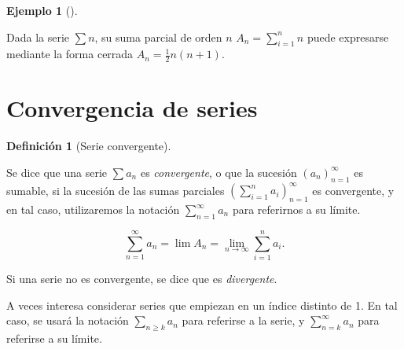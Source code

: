 \documentclass[
  a4paper,
]{scrreport}
\theoremstyle{definition}
\newtheorem{example}{Ejemplo}[chapter]
\theoremstyle{plain}
\theoremstyle{definition}
\newtheorem{definition}{Definición}[chapter]
\theoremstyle{definition}
\theoremstyle{plain}
\theoremstyle{plain}
\theoremstyle{remark}
\begin{document}
\begin{example}[]\protect\hypertarget{exm-serie-forma-cerrada}{}\label{exm-serie-forma-cerrada}

Dada la serie \(\sum n\), su suma parcial de orden \(n\)
\(A_n=\sum_{i=1}^n n\) puede expresarse mediante la forma cerrada
\(A_n = \frac{1}{2}n(n+1)\).

\end{example}

\section{Convergencia de series}\label{convergencia-de-series}

\begin{definition}[Serie
convergente]\protect\hypertarget{def-serie-convergente}{}\label{def-serie-convergente}

Se dice que una serie \(\sum a_n\) es \emph{convergente}, o que la
sucesión \((a_n)_{n=1}^\infty\) es sumable, si la sucesión de las sumas
parciales \(\left(\sum_{i=1}^n a_i\right)_{n=1}^\infty\) es convergente,
y en tal caso, utilizaremos la notación \(\sum_{n=1}^\infty a_n\) para
referirnos a su límite.

\[
\sum_{n=1}^{\infty} a_n=\lim A_n = \lim_{n\to\infty} \sum_{i=1}^n a_i.
\]

\end{definition}

Si una serie no es convergente, se dice que es \emph{divergente}.

A veces interesa considerar series que empiezan en un índice distinto de
1. En tal caso, se usará la notación \(\sum_{n\geq k}a_n\) para
referirse a la serie, y \(\sum_{n=k}^\infty a_n\) para referirse a su
límite.
\end{document}
